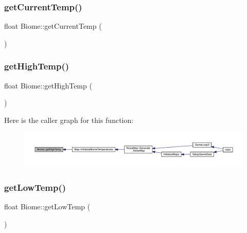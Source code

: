 \mbox{\label{class_biome_ac347b6eeccd189054af58983acd62ea3}} 
\subsubsection{\texorpdfstring{get\+Current\+Temp()}{getCurrentTemp()}}
{\footnotesize\ttfamily float Biome\+::get\+Current\+Temp (\begin{DoxyParamCaption}{ }\end{DoxyParamCaption})}

\mbox{\label{class_biome_afc882c431129cdaae8109ad5dcc8267e}} 
\subsubsection{\texorpdfstring{get\+High\+Temp()}{getHighTemp()}}
{\footnotesize\ttfamily float Biome\+::get\+High\+Temp (\begin{DoxyParamCaption}{ }\end{DoxyParamCaption})}

Here is the caller graph for this function\+:
\nopagebreak
\begin{figure}[H]
\begin{center}
\leavevmode
\includegraphics[width=350pt]{d6/dd0/class_biome_afc882c431129cdaae8109ad5dcc8267e_icgraph}
\end{center}
\end{figure}
\mbox{\label{class_biome_a198f0bb873cce52c8e62df2cf0282e84}} 
\subsubsection{\texorpdfstring{get\+Low\+Temp()}{getLowTemp()}}
{\footnotesize\ttfamily float Biome\+::get\+Low\+Temp (\begin{DoxyParamCaption}{ }\end{DoxyParamCaption})}

